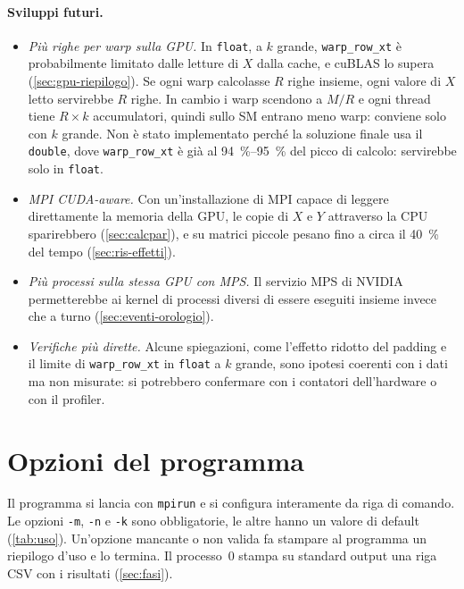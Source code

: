 \documentclass[11pt,a4paper]{article}
\begin{document}
\paragraph{Sviluppi futuri.}
\begin{itemize}
  \item \emph{Più righe per warp sulla GPU.} In \texttt{float}, a $k$ grande,
        \texttt{warp\_row\_xt} è probabilmente limitato dalle letture di $X$
        dalla cache, e cuBLAS lo supera (\cref{sec:gpu-riepilogo}). Se ogni warp
        calcolasse $R$ righe insieme, ogni valore di $X$ letto servirebbe $R$
        righe. In cambio i warp scendono a $M/R$ e
        ogni thread tiene $R \times k$ accumulatori, quindi sullo SM entrano
        meno warp: conviene solo con $k$ grande. Non è stato implementato perché
        la soluzione finale usa il \texttt{double}, dove \texttt{warp\_row\_xt}
        è già al \SIrange{94}{95}{\percent} del picco di calcolo: servirebbe
        solo in \texttt{float}.
  \item \emph{MPI CUDA-aware.} Con un'installazione di MPI capace di leggere
        direttamente la memoria della GPU, le copie di $X$ e $Y$ attraverso la
        CPU sparirebbero (\cref{sec:calcpar}), e su matrici piccole pesano fino a
        circa il \SI{40}{\percent} del tempo (\cref{sec:ris-effetti}).
  \item \emph{Più processi sulla stessa GPU con MPS.} Il servizio MPS di NVIDIA
        permetterebbe ai kernel di processi diversi di essere eseguiti insieme
        invece che a turno (\cref{sec:eventi-orologio}).
  \item \emph{Verifiche più dirette.} Alcune spiegazioni, come l'effetto ridotto del padding e il
        limite di \texttt{warp\_row\_xt} in \texttt{float} a $k$ grande, sono
        ipotesi coerenti con
        i dati ma non misurate: si potrebbero confermare con i contatori
        dell'hardware o con il profiler.
\end{itemize}

\appendix
\section{Opzioni del programma}\label{app:opzioni}

Il programma si lancia con \texttt{mpirun} e si configura interamente da riga
di comando. Le opzioni \texttt{-m}, \texttt{-n} e \texttt{-k} sono
obbligatorie, le altre hanno un valore di default (\cref{tab:uso}).
Un'opzione mancante o non valida fa stampare al programma un riepilogo d'uso e
lo termina. Il processo~0 stampa su standard output una riga CSV con i
risultati (\cref{sec:fasi}).
\end{document}
